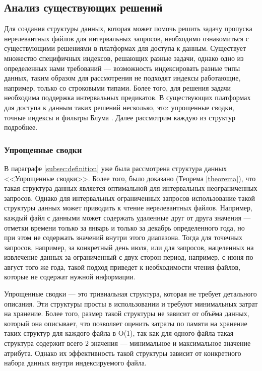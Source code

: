 \subsection{Анализ существующих решений}\label{indexes}

Для создания структуры данных, которая может помочь решить задачу пропуска нерелевантных файлов для интервальных запросов, необходимо ознакомиться с существующими решениями в платформах для доступа к данным. Существует множество специфичных индексов, решающих разные задачи, однако одно из определенных нами требований --- возможность индексировать разные типы данных, таким образом для рассмотрения не подходят индексы работающие, например, только со строковыми типами. Более того, для решения задачи необходима поддержка интервальных предикатов. В существующих платформах для доступа к данным таких решений несколько, это: упрощенные сводки, точные индексы и фильтры Блума \cite{Extensible_data_skipping}. Далее рассмотрим каждую из структур подробнее.

\subsubsection{Упрощенные сводки}\label{column_stats}

В параграфе \ref{subsec:definition} уже была рассмотрена структура данных {<<Упрощенные сводки>>}. Более того, было доказано (Теорема \ref{theorema}), что такая структура данных является оптимальной для интервальных неограниченных запросов. Однако для интервальных ограниченных запросов использование такой структуры данных может приводить к чтение нерелевантных файлов. Например, каждый файл с данными может содержать удаленные друг от друга значения --- отметки времени только за январь и только за декабрь определенного года, но при этом не содержать значений внутри этого диапазона. Тогда для точечных запросов, например, за конкретный день июля, или для запросов, нацеленных на извлечение данных за ограниченный с двух сторон период, например, с июня по август того же года, такой подход приведет к необходимости чтения файлов, которые не содержат нужной информации.

Упрощенные сводки --- это тривиальная структура, которая не требует детального описания. Эти структуры просты в использовании и требуют минимальных затрат на хранение. Более того, размер такой структуры не зависит от объёма данных, который она описывает, что позволяет оценить затраты по памяти на хранение таких структур для каждого файла в O(1), так как для одного файла такая структура содержит всего 2 значения --- минимальное и максимальное значение атрибута. Однако их эффективность такой структуры зависит от конкретного набора данных внутри индексируемого файла.

